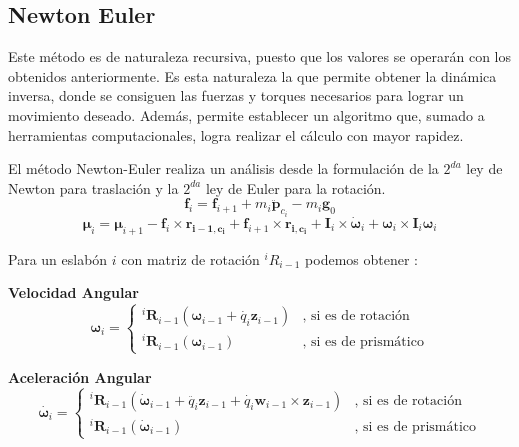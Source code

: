 \subsection{Newton Euler}
Este método es de naturaleza recursiva, puesto que los valores se operarán
con los obtenidos anteriormente. Es esta naturaleza la que permite obtener la
dinámica inversa, donde se consiguen las fuerzas y torques necesarios para
lograr un movimiento deseado. Además, permite establecer un algoritmo que,
sumado a herramientas computacionales, logra realizar el cálculo con mayor
rapidez.

El método Newton-Euler realiza un análisis desde la formulación de la
$2^{da}$ ley de Newton para traslación y la $2^{da}$ ley de Euler para la
rotación.
\begin{equation*}
    \boldsymbol{f}_i = \boldsymbol{f}_{i+1} +
    m_i\ddot{\boldsymbol{p}}_{c_i}-m_i\boldsymbol{g}_0
\end{equation*}
\begin{equation*}
    \boldsymbol{\mu}_i = \boldsymbol{\mu}_{i+1} -
    \boldsymbol{f}_{i}\times\boldsymbol{r_{i-1,c_i}}+\boldsymbol{f}_{i+1}\times\boldsymbol{r_{i,c_i}}+\boldsymbol{I}_i\times\dot{\boldsymbol{\omega}}_i+\boldsymbol{\omega}_i\times\boldsymbol{I}_i\boldsymbol{\omega}_i
\end{equation*}

Para un eslabón $i$ con matriz de rotación $^iR_{i-1}$ podemos obtener
\cite{fundamentos_robo}:

\textbf{Velocidad Angular }
\begin{equation*}
    \boldsymbol{\omega}_i = \begin{cases}
        ^{i}\boldsymbol{R}_{i-1} (\boldsymbol{\omega}_{i-1} +
        \dot{q_i}\boldsymbol{z}_{i-1}) & \text{, si es de rotación} \\
        ^{i}\boldsymbol{R}_{i-1} (\boldsymbol{\omega}_{i-1}) & \text{, si es
            de prismático}
    \end{cases}
\end{equation*}

\textbf{Aceleración Angular }
\begin{equation*}
    \dot{\boldsymbol{\omega}_i} = \begin{cases}
        ^{i}\boldsymbol{R}_{i-1} (\dot{\boldsymbol{\omega}}_{i-1} +
        \ddot{q_i}\boldsymbol{z}_{i-1} +
        \dot{q_i}\boldsymbol{w}_{i-1}\times\boldsymbol{z}_{i-1}) & \text{, si
            es de rotación} \\
        ^{i}\boldsymbol{R}_{i-1} (\dot{\boldsymbol{\omega}}_{i-1}) & \text{, si
            es de prismático}
    \end{cases}
\end{equation*}

